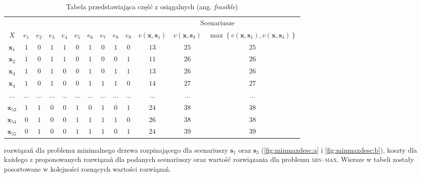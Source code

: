 \begin{table}[!htbp]
	\centering
	\begin{tabular}{ccccccccccccc}
		\cline{11-13}
		\multicolumn{2}{l}{}       &         &         &         &         &         &         &         &         & \multicolumn{3}{c}{Scenariusze}                                                                                                                                                                                              \\
		$X$              & $e_{1}$ & $e_{2}$ & $e_{3}$ & $e_{4}$ & $e_{5}$ & $e_{6}$ & $e_{7}$ & $e_{8}$ & $e_{9}$ & $v \left( \textbf{x}, \textbf{s}_{1} \right) $ & $ v \left( \textbf{x}, \textbf{s}_{3} \right) $ & $\max \left\{ v \left( \textbf{x}, \textbf{s}_{1} \right), v \left( \textbf{x}, \textbf{s}_{3} \right) \right\} $ \\
		$\textbf{x}_{1}$ & $1$     & $0$     & $1$     & $1$     & $0$     & $1$     & $0$     & $1$	&	$0$	&	$13$	&	$25$	&	$25$	\\
		$\textbf{x}_{2}$ & $1$     & $0$     & $1$     & $1$     & $0$     & $1$     & $0$     & $0$	&	$1$	&	$11$	&	$26$	&	$26$	\\
		$\textbf{x}_{3}$ & $1$     & $0$     & $1$     & $0$     & $0$     & $1$     & $0$     & $1$	&	$1$	&	$13$	&	$26$	&	$26$	\\
		$\textbf{x}_{4}$ & $1$     & $0$     & $1$     & $0$     & $0$     & $1$     & $1$     & $1$	&	$0$	&	$14$	&	$27$	&	$27$	\\
		$\dots$ & $\dots$     & $\dots$     & $\dots$     & $\dots$     & $\dots$     & $\dots$     & $\dots$     & $\dots$	&	$\dots$	&	$\dots$	&	$\dots$	&	$\dots$	\\
		$\textbf{x}_{53}$ & $1$     & $1$     & $0$     & $0$     & $1$     & $0$     & $1$     & $0$	&	$1$	&	$24$	&	$38$	&	$38$	\\
		$\textbf{x}_{54}$ & $0$     & $1$     & $0$     & $0$     & $1$     & $1$     & $1$     & $1$	&	$0$	&	$26$	&	$38$	&	$38$	\\
		$\textbf{x}_{55}$ & $0$     & $1$     & $0$     & $0$     & $1$     & $1$     & $1$     & $0$	&	$1$	&	$24$	&	$39$	&	$39$	\\
		 \hline
	\end{tabular}
	\caption{Tabela przedstawiająca część z osiągalnych (ang. \textit{feasible})} rozwiązań dla problemu minimalnego drzewa rozpinającego dla scenariuszy $\textbf{s}_{1}$ oraz $\textbf{s}_{3}$ (\ref{fig:minmaxdesc:a} i \ref{fig:minmaxdesc:b}), koszty dla każdego z proponowanych rozwiązań dla podanych scenariuszy oraz wartość rozwiązania dla problemu \textsc{min--max}. Wiersze w tabeli zostały posortowane w kolejności rosnących wartości rozwiązań.
	\label{tab:minmaxexample}
\end{table}

